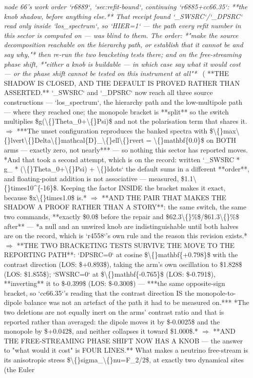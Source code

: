 \begin{description}
\textit{node 66's work order `r6889`, `sec:refit-bound`, continuing `r6885+cc66.35`: **the knob shadow, before anything else.** That receipt found `\_SWSRC`/`\_DPSRC` read only inside `los\_spectrum`, so `HIER=1` --- the path every refit number in this sector is computed on --- was blind to them. The order: *"make the source decomposition reachable on the hierarchy path, or establish that it cannot be and say why,"* then re-run the two bracketing tests there; and on the free-streaming phase shift, *"either a knob is buildable --- in which case say what it would cost --- or the phase shift cannot be tested on this instrument at all"*} \ ( **THE SHADOW IS CLOSED, AND THE DEFAULT IS PROVED RATHER THAN ASSERTED.** `\_SWSRC` and `\_DPSRC` now reach all three source constructions --- `los\_spectrum`, the hierarchy path and the low-multipole path --- where they reached one; the monopole bracket is **split** so the switch multiplies \$g(\textbackslash\{\}Theta\_0+\textbackslash\{\}Psi)\$ and not the polarisation term that shares it. \ensuremath{\Rightarrow} ***The unset configuration reproduces the banked spectra with \$\textbackslash\{\}max\textbackslash\{\}lvert\textbackslash\{\}Delta\textbackslash\{\}mathcal\{D\}\_\textbackslash\{\}ell\textbackslash\{\}rvert = \textbackslash\{\}mathbf\{0.0\}\$ on BOTH arms --- exactly zero, not nearly*** --- so nothing this sector has reported moves.  *And that took a second attempt, which is on the record: written `\_SWSRC * g\_ * (\textbackslash\{\}Theta\_0+\textbackslash\{\}Psi) + \textbackslash\{\}ldots` the default sums in a different **order**, and floating-point addition is not associative --- measured, \$1.1\textbackslash\{\}times10\textasciicircum{}\{-16\}\$. Keeping the factor INSIDE the bracket makes it exact, because \$x\textbackslash\{\}times1.0\$ is.* \ensuremath{\Rightarrow}  **AND THE PAIR THAT MAKES THE SHADOW A PROOF RATHER THAN A STORY**: the same switch, the same two commands, **exactly \$0.0\$ before the repair and \$62.3\textbackslash\{\}\%\$/\$61.3\textbackslash\{\}\%\$ after** --- *a null and an unwired knob are indistinguishable until both halves are on the record, which is `r4558`'s own rule and the reason this revision exists.* \ensuremath{\Rightarrow}  **THE TWO BRACKETING TESTS SURVIVE THE MOVE TO THE REPORTING PATH**: `DPSRC=0` at cosine \$\textbackslash\{\}mathbf\{+0.798\}\$ with the contrast direction (LOS: \$+0.893\$), taking the arm's own oscillation to \$1.828\$ (LOS: \$1.855\$); `SWSRC=0` at \$\textbackslash\{\}mathbf\{-0.765\}\$ (LOS: \$-0.791\$), **inverting** it to \$-0.399\$ (LOS: \$-0.300\$) --- ***the same opposite-sign bracket, so `cc66.35`'s reading that the contrast direction IS the monopole-to-dipole balance was not an artefact of the path it had to be measured on.***  *The two deletions are not equally inert on the arms' contrast ratio and that is reported rather than averaged: the dipole moves it by \$-0.0025\$ and the monopole by \$+0.042\$, and neither collapses it toward \$1.000\$.* \ensuremath{\Rightarrow}  **AND THE FREE-STREAMING PHASE SHIFT NOW HAS A KNOB --- the answer to "what would it cost" is FOUR LINES.** What makes a neutrino free-stream is its anisotropic stress \$\textbackslash\{\}sigma\_\textbackslash\{\}nu=F\_2/2\$, at exactly two dynamical sites (the Euler 
\end{description}
